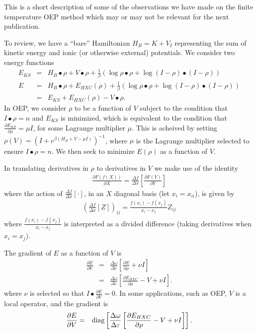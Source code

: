\documentclass{article}
\newcommand{\beas}{\begin{eqnarray*}}
\newcommand{\enas}{\end{eqnarray*}}
\newcommand{\Vscp}{V}
\begin{document}
This is a short description of some of the observations we have
made on the finite temperature OEP method which may or may not be relevant
for the next publication.

To review, we have a ``bare'' Hamiltonian $H_B = K + V_{I}$ representing
the sum of kinetic energy and ionic (or otherwise external) potentials.
We consider two energy functions
\beas
E_{KS} &=& H_B \bullet \rho + \Vscp \bullet \rho + \frac{1}{\beta}
           \left( \log\rho \bullet \rho + \log(I-\rho) \bullet (I-\rho) \right)\\
E &=& H_B \bullet \rho + E_{HXC}(\rho) + \frac{1}{\beta}
           \left( \log\rho \bullet \rho + \log(I-\rho) \bullet (I-\rho) \right)\\
  &=& E_{KS} + E_{HXC}(\rho) - \Vscp \bullet \rho.
\enas
In OEP, we consider $\rho$ to be a function of $\Vscp$ subject to the condition
that $I \bullet \rho = n$ and $E_{KS}$ is minimized, which is equivalent
to the condition that $\frac{\partial E_{KS}}{\partial \rho} = \mu I$, for
some Lagrange multiplier $\mu$.  This is acheived by
setting
$\rho(\Vscp) = (I + e^{\beta (H_B + \Vscp - \mu I)})^{-1}$, where $\mu$ is the
Lagrange multiplier selected to ensure $I\bullet \rho = n$.  We then
seek to minimize $E(\rho)$ as a function of $\Vscp$.

In translating derivatives in $\rho$ to derivatives in $\Vscp$ we make use of
the identity
\beas
  \frac{\partial F( f(X) )}{\partial X}
  = \frac{\Delta f}{\Delta x}\left[ \frac{\partial F(Y)}{\partial Y} \right]
\enas
where the action of $\frac{\Delta f}{\Delta x}\left[\cdot\right]$, in an
$X$ diagonal basis (let $x_i = x_{ii}$), is given by
\beas
\left(\frac{\Delta f}{\Delta x}\left[ Z \right]\right)_{ij}
  = \frac{f(x_{i}) - f(x_{j})}{x_{i}-x_{j}} Z_{ij}
\enas
where $ \frac{f(x_{i}) - f(x_{j})}{x_{i}-x_{j}}$ is interpreted
as a divided difference (taking derivatives when $x_{i} = x_{j}$).

The gradient of $E$ as a function of $\Vscp$ is
\beas
  \frac{\partial E}{\partial \Vscp}
  &=& \frac{\Delta \omega}{\Delta \varepsilon}
      \left[ \frac{\partial E}{\partial \rho} + \nu I \right]\\
  &=& \frac{\Delta \omega}{\Delta \varepsilon}
      \left[ \frac{\partial E_{HXC}}{\partial \rho} - \Vscp + \nu I \right].
\enas
where $\nu$ is selected so that 
$I\bullet \frac{\partial E}{\partial \Vscp} = 0$.  In some applications, such as
OEP, $\Vscp$ is a local operator, and the gradient is
\beas
  \frac{\partial E}{\partial \Vscp}
  &=& \diag\left[\frac{\Delta \omega}{\Delta \varepsilon}
      \left[ \frac{\partial E_{HXC}}{\partial \rho} - \Vscp + \nu I \right]\right].
\enas
\end{document}
